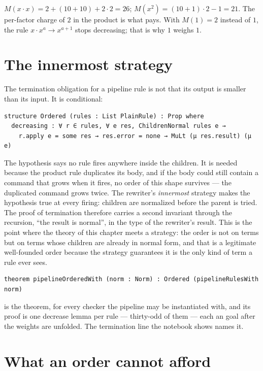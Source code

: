 \begin{exbox}[$x \cdot x \to x^2$]
  $M(x \cdot x) = 2 + (10 + 10) + 2 \cdot 2 = 26$; $M(x^2) = (10 + 1) \cdot 2 - 1 = 21$. The
  per-factor charge of $2$ in the product is what pays. With $M(1) = 2$ instead of $1$, the rule
  $x \cdot x^a \to x^{a+1}$ stops decreasing; that is why $1$ weighs $1$.
\end{exbox}

\section{The innermost strategy}

The termination obligation for a pipeline rule is not that its output is smaller than its input.
It is conditional:

\begin{verbatim}
structure Ordered (rules : List PlainRule) : Prop where
  decreasing : ∀ r ∈ rules, ∀ e res, ChildrenNormal rules e →
    r.apply e = some res → res.error = none → MuLt (μ res.result) (μ e)
\end{verbatim}

The hypothesis  says no rule fires anywhere inside the children. It is needed
because the product rule duplicates its body, and if the body could still contain a command that
grows when it fires, no order of this shape survives --- the duplicated command grows twice. The
rewriter's \emph{innermost} strategy makes the hypothesis true at every firing: children are
normalized before the parent is tried. The proof of termination therefore carries a second
invariant through the recursion, ``the result is normal'', in the type of the rewriter's result.
This is the point where the theory of this chapter meets a strategy: the order is not on terms
but on terms whose children are already in normal form, and that is a legitimate well-founded
order because the strategy guarantees it is the only kind of term a rule ever sees.

\begin{verbatim}
theorem pipelineOrderedWith (norm : Norm) : Ordered (pipelineRulesWith norm)
\end{verbatim}

is the theorem, for every checker  the pipeline may be instantiated with, and its proof
is one decrease lemma per rule --- thirty-odd of them --- each an  goal after the
weights are unfolded. The termination line the notebook shows names it.

\section{What an order cannot afford}

